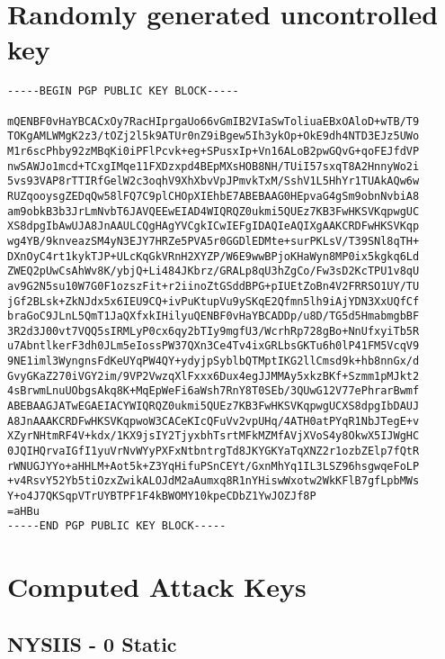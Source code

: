 \appendix

\chapter{Randomly generated uncontrolled key}
\label{appendix:uncontrolled_key}
\begin{lstlisting}
-----BEGIN PGP PUBLIC KEY BLOCK-----

mQENBF0vHaYBCACxOy7RacHIprgaUo66vGmIB2VIaSwToliuaEBxOAloD+wTB/T9
TOKgAMLWMgK2z3/tOZj2l5k9ATUr0nZ9iBgew5Ih3ykOp+OkE9dh4NTD3EJz5UWo
M1r6scPhby92zMBqKi0iPFlPcvk+eg+SPusxIp+Vn16ALoB2pwGQvG+qoFEJfdVP
nwSAWJo1mcd+TCxgIMqe11FXDzxpd4BEpMXsHOB8NH/TUiI57sxqT8A2HnnyWo2i
5vs93VAP8rTTIRfGelW2c3oqhV9XhXbvVpJPmvkTxM/SshV1L5HhYr1TUAkAQw6w
RUZqooysgZEDqQw58lFQ7C9plCHOpXIEhbE7ABEBAAG0HEpvaG4gSm9obnNvbiA8
am9obkB3b3JrLmNvbT6JAVQEEwEIAD4WIQRQZ0ukmi5QUEz7KB3FwHKSVKqpwgUC
XS8dpgIbAwUJA8JnAAULCQgHAgYVCgkICwIEFgIDAQIeAQIXgAAKCRDFwHKSVKqp
wg4YB/9knveazSM4yN3EJY7HRZe5PVA5r0GGDlEDMte+surPKLsV/T39SNl8qTH+
DXnOyC4rt1kykTJP+ULcKqGkVRnH2XYZP/W6E9wwBPjoKHaWyn8MP0ix5kgkq6Ld
ZWEQ2pUwCsAhWv8K/ybjQ+Li484JKbrz/GRALp8qU3hZgCo/Fw3sD2KcTPU1v8qU
av9G2N5su10W7G0F1ozszFit+r2iinoZtGSddBPG+pIUEtZoBn4V2FRRSO1UY/TU
jGf2BLsk+ZkNJdx5x6IEU9CQ+ivPuKtupVu9ySKqE2Qfmn5lh9iAjYDN3XxUQfCf
braGoC9JLnL5QmT1JaQXfxkIHilyuQENBF0vHaYBCADDp/u8D/TG5d5HmabmgbBF
3R2d3J00vt7VQQ5sIRMLyP0cx6qy2bTIy9mgfU3/WcrhRp728gBo+NnUfxyiTb5R
u7AbntlkerF3dh0JLm5eIossPW37QXn3Ce4Tv4ixGRLbsGKTu6h0lP41FM5VcqV9
9NE1iml3WyngnsFdKeUYqPW4QY+ydyjpSyblbQTMptIKG2llCmsd9k+hb8nnGx/d
GvyGKaZ270iVGY2im/9VP2VwzqXlFxxx6Dux4egJJMMAy5xkzBKf+Szmm1pMJkt2
4sBrwmLnuUObgsAkq8K+MqEpWeFi6aWsh7RnY8T0SEb/3QUwG12V77ePhrarBwmf
ABEBAAGJATwEGAEIACYWIQRQZ0ukmi5QUEz7KB3FwHKSVKqpwgUCXS8dpgIbDAUJ
A8JnAAAKCRDFwHKSVKqpwoW3CACeKIcQFuVv2vpUHq/4ATH0atPYqR1NbJTegE+v
XZyrNHtmRF4V+kdx/1KX9jsIY2TjyxbhTsrtMFkMZMfAVjXVoS4y8OkwX5IJWgHC
0JQIHQrvaIGfI1yuVrNvWYyPXFxNtbntrgTd8JKYGKYaTqXNZ2r1ozbZElp7fQtR
rWNUGJYYo+aHHLM+Aot5k+Z3YqHifuPSnCEYt/GxnMhYq1IL3LSZ96hsgwqeFoLP
+v4RsvY52Yb5tiOzxZwikALOJdM2aAumxq8R1nYHiswWxotw2WkKFlB7gfLpbMWs
Y+o4J7QKSqpVTrUYBTPF1F4kBWOMY10kpeCDbZ1YwJOZJf8P
=aHBu
-----END PGP PUBLIC KEY BLOCK-----
\end{lstlisting}

\chapter{Computed Attack Keys}

\section{NYSIIS - 0 Static}
\label{appendix:nysiis_0_static}

